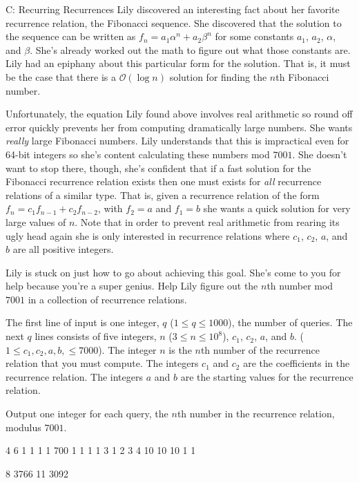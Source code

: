 \begin{problem}{C: Recurring Recurrences}
Lily discovered an interesting fact about her favorite recurrence relation, the Fibonacci sequence.
She discovered that the solution to the sequence can be written as $f_n = a_1 \alpha^n + a_2 \beta^n$ for some constants $a_1$, $a_2$, $\alpha$, and $\beta$.
She's already worked out the math to figure out what those constants are.
Lily had an epiphany about this particular form for the solution.
That is, it must be the case that there is a $\mathcal{O}(\log n)$ solution for finding the $n$th Fibonacci number.

Unfortunately, the equation Lily found above involves real arithmetic so round off error quickly prevents her from computing dramatically large numbers.
She wants \textit{really} large Fibonacci numbers.
Lily understands that this is impractical even for 64-bit integers so she's content calculating these numbers mod $7001$.
She doesn't want to stop there, though, she's confident that if a fast solution for the Fibonacci recurrence relation exists then one must exists for \textit{all} recurrence relations of a similar type.
That is, given a recurrence relation of the form $f_n = c_1 f_{n-1} + c_2 f_{n-2}$, with $f_2 = a$ and $f_1 = b$ she wants a quick solution for very large values of $n$.
Note that in order to prevent real arithmetic from rearing its ugly head again she is only interested in recurrence relations where $c_1$, $c_2$, $a$, and $b$ are all positive integers.

Lily is stuck on just how to go about achieving this goal.
She's come to you for help because you're a super genius.
Help Lily figure out the $n$th number mod $7001$ in a collection of recurrence relations.
\end{problem}

\begin{formalin}
The first line of input is one integer, $q$ ($1 \leq q \leq 1000$), the number of queries.
The next $q$ lines consists of five integers, $n$ ($3 \leq n \leq 10^8$), $c_1$, $c_2$, $a$, and $b$. ($1 \leq c_1, c_2, a, b, \leq 7000$).
The integer $n$ is the $n$th number of the recurrence relation that you must compute.
The integers $c_1$ and $c_2$ are the coefficients in the recurrence relation.
The integers $a$ and $b$ are the starting values for the recurrence relation.
\end{formalin}

\begin{formalout}
Output one integer for each query, the $n$th number in the recurrence relation, modulus $7001$.
\end{formalout}

\begin{datain}
4
6 1 1 1 1
700 1 1 1 1
3 1 2 3 4
10 10 10 1 1
\end{datain}

\begin{dataout}
8
3766
11
3092
\end{dataout}
